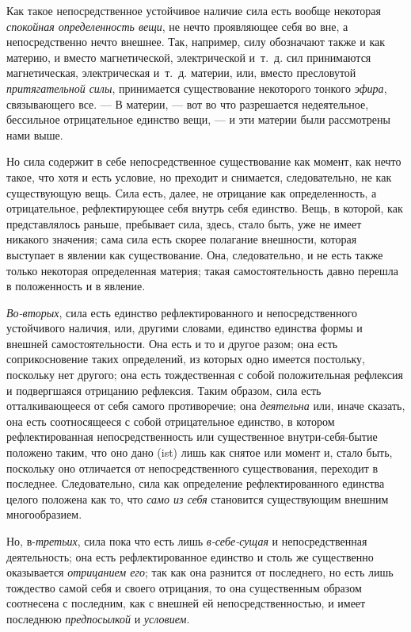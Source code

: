 Как такое непосредственное устойчивое наличие сила есть вообще некоторая
{\em спокойная определенность вещи}, не нечто
проявляющее себя во вне, а непосредственно нечто внешнее. Так, например,
силу обозначают также и как материю, и вместо магнетической, электрической
и~т.~д. сил принимаются магнетическая, электрическая и~т.~д. материи, или,
вместо пресловутой {\em притягательной силы},
принимается существование некоторого тонкого
{\em эфира}, связывающего все. — В материи, — вот во
что разрешается недеятельное, бессильное отрицательное единство вещи, — и
эти материи были рассмотрены нами выше.

Но сила содержит в себе непосредственное существование как момент, как нечто
такое, что хотя и есть условие, но преходит и снимается, следовательно, не
как существующую вещь. Сила есть, далее, не отрицание как определенность, а
отрицательное, рефлектирующее себя внутрь себя единство. Вещь, в которой,
как представлялось раньше, пребывает сила, здесь, стало быть, уже не имеет
никакого значения; сама сила есть скорее полагание внешности, которая
выступает в явлении как существование. Она, следовательно, и не есть также
только некоторая определенная материя; такая самостоятельность давно
перешла в положенность и в явление.

{\em Во-вторых}, сила есть единство рефлектированного и
непосредственного устойчивого наличия, или, другими словами, единство
единства формы и внешней самостоятельности. Она есть и то и другое разом;
она есть соприкосновение таких определений, из которых одно имеется
постольку, поскольку нет другого; она есть тождественная с собой
положительная рефлексия и подвергшаяся отрицанию рефлексия. Таким образом,
сила есть отталкивающееся от себя самого противоречие; она
{\em деятельна} или, иначе сказать, она есть
соотносящееся с собой отрицательное единство, в котором рефлектированная
непосредственность или существенное внутри-себя-бытие положено таким, что
оно дано (ist) лишь как снятое или момент и, стало быть, поскольку оно
отличается от непосредственного существования, переходит в последнее.
Следовательно, сила как определение рефлектированного единства целого
положена как то, что {\em само из себя} становится
существующим внешним многообразием.

Но, в-{\em третьих}, сила пока что есть лишь
{\em в-себе-сущая} и непосредственная деятельность; она
есть рефлектированное единство и столь же существенно оказывается
{\em отрицанием его}; так как она разнится от
последнего, но есть лишь тождество самой себя и своего отрицания, то она
существенным образом соотнесена с последним, как с внешней ей
непосредственностью, и имеет последнюю
{\em предпосылкой} и
{\em условием}.

